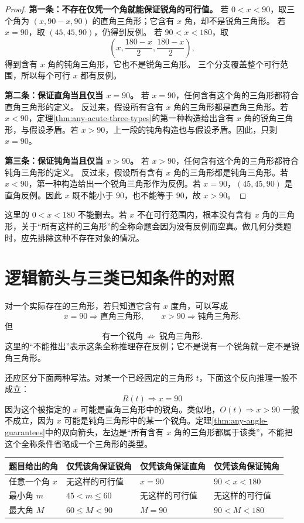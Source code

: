 \documentclass[UTF8,a4paper,zihao=-4,oneside,openany,fontset=fandol]{ctexbook}
\theoremstyle{definition}
\theoremstyle{remark}
\begin{document}
\begin{proof}
\textbf{第一条：不存在仅凭一个角就能保证锐角的可行值。}
若 $0<x<90$，取三个角为 $(x,90-x,90)$ 的直角三角形；它含有 $x$ 角，却不是锐角三角形。
若 $x=90$，取 $(45,45,90)$，仍得到反例。
若 $90<x<180$，取
\[
\left(x,\frac{180-x}{2},\frac{180-x}{2}\right),
\]
得到含有 $x$ 角的钝角三角形，它也不是锐角三角形。
三个分支覆盖整个可行范围，所以每个可行 $x$ 都有反例。

\textbf{第二条：保证直角当且仅当 $x=90$。}
若 $x=90$，任何含有这个角的三角形都符合直角三角形的定义。
反过来，假设所有含有 $x$ 角的三角形都是直角三角形。若 $x<90$，定理\ref{thm:any-acute-three-types}的第一种构造给出含有 $x$ 角的锐角三角形，与假设矛盾。若 $x>90$，上一段的钝角构造也与假设矛盾。因此，只剩 $x=90$。

\textbf{第三条：保证钝角当且仅当 $x>90$。}
若 $x>90$，任何含有这个角的三角形都符合钝角三角形的定义。
反过来，假设所有含有 $x$ 角的三角形都是钝角三角形。若 $x<90$，第一种构造给出一个锐角三角形作为反例。若 $x=90$，$(45,45,90)$ 是直角反例。因此 $x$ 既不能小于 $90$，也不能等于 $90$，故 $x>90$。
\end{proof}

这里的 $0<x<180$ 不能删去。若 $x$ 不在可行范围内，根本没有含有 $x$ 角的三角形，关于“所有这样的三角形”的全称命题会因为没有反例而空真。做几何分类题时，应先排除这种不存在对象的情况。

\section{逻辑箭头与三类已知条件的对照}

对一个实际存在的三角形，若只知道它含有 $x$ 度角，可以写成
\[
\boxed{x=90\Rightarrow\text{直角三角形}},
\qquad
\boxed{x>90\Rightarrow\text{钝角三角形}}.
\]
但
\[
\text{有一个锐角}\ \nRightarrow\ \text{锐角三角形}.
\]
这里的“不能推出”表示这条全称推理存在反例；它不是说有一个锐角就一定不是锐角三角形。

还应区分下面两种写法。对某一个已经固定的三角形 $t$，下面这个反向推理一般不成立：
\[
R(t)\Rightarrow x=90
\]
因为这个被指定的 $x$ 可能是直角三角形中的锐角。类似地，$O(t)\Rightarrow x>90$ 一般不成立，因为 $x$ 可能是钝角三角形中的某一个锐角。定理\ref{thm:any-angle-guarantees}中的双向箭头，左边是“所有含有 $x$ 角的三角形都属于该类”，不能把这个全称条件省略成一个三角形的类型。

\begin{center}
\begin{tabularx}{\textwidth}{|p{}|X|X|X|}
\hline
题目给出的角 & 仅凭该角保证锐角 & 仅凭该角保证直角 & 仅凭该角保证钝角\\
\hline
任意一个角 $x$ & 无这样的可行值 & $x=90$ & $90<x<180$\\
\hline
最小角 $m$ & $45<m\le60$ & 无这样的可行值 & 无这样的可行值\\
\hline
最大角 $M$ & $60\le M<90$ & $M=90$ & $90<M<180$\\
\hline
\end{tabularx}
\end{center}
\end{document}
